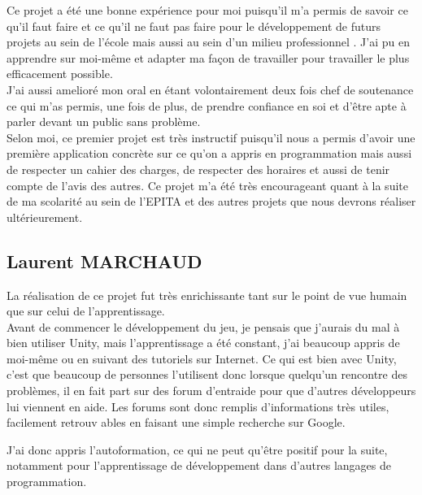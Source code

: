 \documentclass[a4paper , 12pt]{article}
\begin{document}
Ce projet a été une bonne expérience pour moi puisqu’il m’a permis de savoir ce qu’il faut faire et ce qu’il ne faut pas faire pour le développement de futurs projets au sein de l’école mais aussi au sein d’un milieu professionnel .
J’ai pu en apprendre sur moi-même et adapter ma façon de travailler pour travailler le plus efficacement possible.\\

J’ai aussi amelioré mon oral en étant volontairement deux fois chef de soutenance ce qui m’as permis, une fois de plus, de prendre confiance en soi et d’être apte à parler devant un public sans problème.\\

Selon moi, ce premier projet est très instructif puisqu’il nous a permis d’avoir une première application concrète sur ce qu’on a appris en programmation mais aussi de respecter un cahier des charges, de respecter des horaires et aussi de tenir compte de l’avis des autres. Ce projet m’a été très encourageant quant à la suite de ma scolarité au sein de l’EPITA et des autres projets que nous devrons réaliser ultérieurement.

\quad



\subsection{Laurent MARCHAUD}

\quad

La réalisation de ce projet fut très enrichissante tant sur le point de vue humain que sur celui de l’apprentissage.\\

Avant de commencer le développement du jeu, je pensais que j’aurais du mal à bien utiliser Unity, mais l’apprentissage a été constant, j’ai beaucoup appris de moi-même ou en suivant des tutoriels sur Internet. Ce qui est bien avec Unity, c’est que beaucoup de personnes l’utilisent donc lorsque quelqu'un rencontre des problèmes, il en fait part sur des forum d’entraide pour que d’autres développeurs lui viennent en aide. Les forums sont donc remplis d’informations très utiles, facilement retrouv ables en faisant une simple recherche sur Google.\\

\newpage


J’ai donc appris l’autoformation, ce qui ne peut qu’être positif pour la suite, notamment pour l’apprentissage de développement dans d’autres langages de programmation.\\
\end{document}
